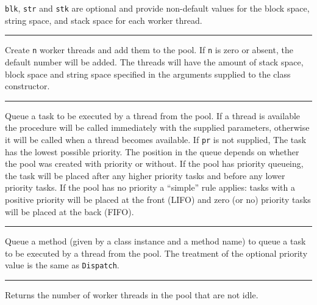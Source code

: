 \texttt{blk}, \texttt{str} and \texttt{stk} are optional and provide non-default
values for the block space, string space, and stack space for each worker
thread.\\

\bigskip\hrule\vspace{0.1cm}
\noindent{}

Create \texttt{n} worker threads and add them to the pool.  If \texttt{n} is
zero or absent, the default number will be added. The threads will have the
amount of stack space, block space and string space specified in the arguments
supplied to the class constructor.

\bigskip\hrule\vspace{0.1cm}
\noindent{}

Queue a task to be executed by a thread from the pool. If a thread is available
the procedure will be called immediately with the supplied parameters, otherwise
it will be called when a thread becomes available. If \texttt{pr} is not
supplied, The task has the lowest possible priority. The position in the queue
depends on whether the pool was created with priority or without.
If the pool has priority queueing, the task will be placed after any higher
priority tasks and before any lower priority tasks.
If the pool has no priority a ``simple'' rule applies: tasks with a positive
priority will be placed at the front (LIFO) and zero (or no) priority tasks will
be placed at the back (FIFO).

\bigskip\hrule\vspace{0.1cm}
\noindent{}

Queue a method (given by a class instance and a method name) to queue a task to
be executed by a thread from the pool. The treatment of the optional priority
value is the same as \texttt{Dispatch}.

\bigskip\hrule\vspace{0.1cm}
\noindent{}

Returns the number of worker threads in the pool that are not idle.\\


